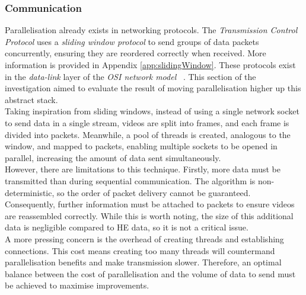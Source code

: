 \subsubsection{Communication}
\label{sec:communication}
\indent \indent
Parallelisation already exists in networking protocols. The \textit{Transmission Control Protocol} uses a \textit{sliding window protocol} to send groups of data packets concurrently, ensuring they are reordered correctly when received. More information is provided in Appendix \ref{app:slidingWindow}. These protocols exist in the \textit{data-link} layer of the \textit{OSI network model} ~\cite{OSI}. This section of the investigation aimed to evaluate the result of moving parallelisation higher up this abstract stack.
\smallskip \\ \indent
Taking inspiration from sliding windows, instead of using a single network socket to send data in a single stream, videos are split into frames, and each frame is divided into packets. Meanwhile, a pool of threads is created, analogous to the window, and mapped to packets, enabling multiple sockets to be opened in parallel, increasing the amount of data sent simultaneously.
\smallskip \\ \indent
However, there are limitations to this technique. Firstly, more data must be transmitted than during sequential communication. The algorithm is non-deterministic, so the order of packet delivery cannot be guaranteed. Consequently, further information must be attached to packets to ensure videos are reassembled correctly. While this is worth noting, the size of this additional data is negligible compared to HE data, so it is not a critical issue.
\smallskip \\ \indent
A more pressing concern is the overhead of creating threads and establishing connections. This cost means creating too many threads will countermand parallelisation benefits and make transmission slower. Therefore, an optimal balance between the cost of parallelisation and the volume of data to send must be achieved to maximise improvements.
